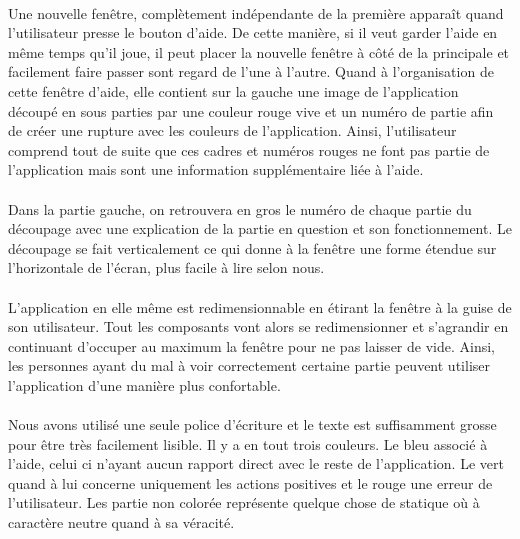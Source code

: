 \documentclass[a4paper, 12pt]{article}
\begin{document}
    \paragraph{}
    Une nouvelle fenêtre, complètement indépendante de la première apparaît quand l'utilisateur presse le bouton d'aide. De cette manière, si il veut garder l'aide en même temps qu'il joue, il peut placer la nouvelle fenêtre à côté de la principale et facilement faire passer sont regard de l'une à l'autre.
    Quand à l'organisation de cette fenêtre d'aide, elle contient sur la gauche une image de l'application découpé en sous parties par une couleur rouge vive et un numéro de partie afin de créer une rupture avec les couleurs de l'application. Ainsi, l'utilisateur comprend tout de suite que ces cadres et numéros rouges ne font pas partie de l'application mais sont une information supplémentaire liée à l'aide.
    
    \paragraph{}
    Dans la partie gauche, on retrouvera en gros le numéro de chaque partie du découpage avec une explication de la partie en question et son fonctionnement.  Le découpage se fait verticalement ce qui donne à la fenêtre une forme étendue sur l'horizontale de l'écran, plus facile à lire selon nous.
     
    \paragraph{}
    L'application en elle même est redimensionnable en étirant la fenêtre à la guise de son utilisateur. Tout les composants vont alors se redimensionner et s'agrandir en continuant d'occuper au maximum la fenêtre pour ne pas laisser de vide. Ainsi, les personnes ayant du mal à voir correctement certaine partie peuvent utiliser l'application d'une manière plus confortable.
      
    \paragraph{}
    Nous avons utilisé une seule police d'écriture et le texte est suffisamment grosse pour être très facilement lisible. Il y a en tout trois couleurs. Le bleu associé à l'aide, celui ci n'ayant aucun rapport direct avec le reste de l'application. Le vert quand à lui concerne uniquement les actions positives et le rouge une erreur de l'utilisateur. Les partie non colorée représente quelque chose de statique où à caractère neutre quand à sa véracité.
    
\end{document}
